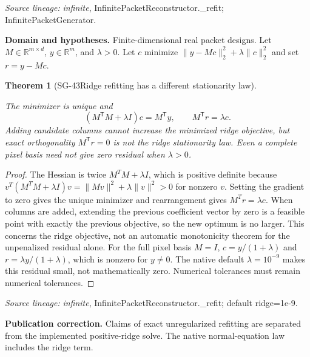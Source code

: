 \documentclass[11pt]{article}
\newtheorem{theorem}{Theorem}[section]
\theoremstyle{definition}\newtheorem{definition}[theorem]{Definition}
\theoremstyle{remark}\newtheorem{remark}[theorem]{Remark}
\begin{document}
\par{\small\color{Teal}\textit{Source lineage:} \textit{infinite}, InfinitePacketReconstructor.\_refit; InfinitePacketGenerator.}\par

\par{\small\textbf{Domain and hypotheses.} Finite-dimensional real packet designs. Let $M\in\mathbb R^{m\times d}$, $y\in\mathbb R^m$, and $\lambda>0$. Let $c$ minimize $\|y-Mc\|_2^2+\lambda\|c\|_2^2$ and set $r=y-Mc$.}\par
\begin{theorem}[SG-43\quad Ridge refitting has a different stationarity law]\label{SG-43}

The minimizer is unique and
\[
 (M^{\mathsf T}M+\lambda I)c=M^{\mathsf T}y,
 \qquad M^{\mathsf T}r=\lambda c.
\]
Adding candidate columns cannot increase the minimized ridge objective,
but exact orthogonality $M^{\mathsf T}r=0$ is not the ridge stationarity law.
Even a complete pixel basis need not give zero residual when $\lambda>0$.

\end{theorem}
\begin{proof}

The Hessian is twice $M^TM+\lambda I$, which is positive definite because
$v^T(M^TM+\lambda I)v=\|Mv\|^2+\lambda\|v\|^2>0$ for nonzero $v$.
Setting the gradient to zero gives the unique minimizer and rearrangement gives
$M^Tr=\lambda c$. When columns are added, extending the previous coefficient
vector by zero is a feasible point with exactly the previous objective, so the
new optimum is no larger. This concerns the ridge objective, not an automatic
monotonicity theorem for the unpenalized residual alone.
For the full pixel basis $M=I$, $c=y/(1+\lambda)$ and
$r=\lambda y/(1+\lambda)$, which is nonzero for $y\ne0$.
The native default $\lambda=10^{-9}$ makes this residual small, not
mathematically zero. Numerical tolerances must remain numerical tolerances.

\end{proof}

\par{\small\color{Teal}\textit{Source lineage:} \textit{infinite}, InfinitePacketReconstructor.\_refit; default ridge=1e-9.}\par

\par{\small\textbf{Publication correction.} Claims of exact unregularized refitting are separated from the implemented positive-ridge solve. The native normal-equation law includes the ridge term.}\par
\end{document}
